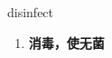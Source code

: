 
\begin{frame}
{\huge disinfect}
\begin{center}
\begin{enumerate}\Large
  \item \textbf{消毒，使无菌}
\end{enumerate}
\end{center}
\end{frame}

